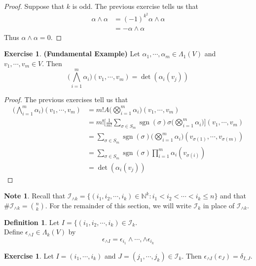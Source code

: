 \documentclass[12pt]{amsart}
\theoremstyle{definition}
\newtheorem{defn}[definition]{Definition}
\newtheorem{note}[definition]{Note}
\theoremstyle{definition}
\newtheorem{ex}[definition]{Exercise}
\newcommand{\al}{\alpha}
\newcommand{\del}{\delta}
\newcommand{\Lam}{\Lambda}
\newcommand{\ep}{\epsilon}
\newcommand{\sig}{\sigma}
\newcommand{\N}{\mathbb{N}}
\newcommand{\MI}{\mathcal{I}}
\DeclareMathOperator{\sgn}{sgn}
\begin{document}
	\begin{proof}
		Suppose that $k$ is odd. The previous exercise tells us that 
		\begin{align*}
			\al \wedge \al 
			&= (-1)^{k^2} \al \wedge \al \\
			&= -\al \wedge \al
		\end{align*}
		Thus $\al \wedge \al = 0$.
	\end{proof}
	
	\begin{ex}\textbf{(Fundamental Example)}
		Let $\al_1, \cdots, \al_m \in \Lam_1(V)$ and $v_1, \cdots, v_m \in V$. Then $$\bigg( \bigwedge_{i=1}^m \al_i \bigg)(v_1, \cdots, v_m) = \det (\al_i (v_j))$$
	\end{ex}

	\begin{proof}
		The previous exercises tell us that
		\begin{align*}
			\bigg( \bigwedge_{i=1}^m \al_i \bigg)(v_1, \cdots, v_m)
			&= m! A\bigg( \bigotimes_{i=1}^m \al_i \bigg) (v_1, \cdots, v_m) \\
			&= m! \bigg[ \frac{1}{m!} \sum_{\sig \in S_{m}} \sgn(\sig) \sig \bigg(\bigotimes_{i=1}^m \al_i \bigg) \bigg] (v_1, \cdots, v_m) \\
			&= \sum_{\sig \in S_{m}} \sgn(\sig)  \bigg(\bigotimes_{i=1}^m \al_i \bigg) (v_{\sig(1)}, \cdots, v_{\sig(m)}) \\
			&= \sum_{\sig \in S_{m}} \sgn(\sig)  \prod_{i=1}^m \al_i(v_{\sig(i)})   \\
			&= \det (\al_i (v_j))
		\end{align*}
	\end{proof}

	\begin{note}
		Recall that $\MI_{\wedge k} = \{(i_1, i_2, \cdots, i_k) \in \N^k: i_1 < i_2 < \cdots < i_k \leq n \}$ and that $\# \MI_{\wedge k} = {n \choose k}$. For the remainder of this section, we will write $\MI_k$ in place of $\MI_{\wedge k}$.
	\end{note}

	\begin{defn}
		Let $I = \{(i_1, i_2, \cdots, i_k) \in \MI_k$. \\ Define $\ep_{\wedge I} \in \Lam_k(V)$ by $$ \ep_{\wedge I} = \ep_{i_1} \wedge \cdots, \wedge \ep_{i_k} $$ 
	\end{defn}

	\begin{ex}
		Let $I = (i_1, \cdots, i_k)$ and $J = (j_1, \cdots, j_k) \in \MI_k$. Then $\ep_{\wedge I} (e_J) = \del_{I,J}$.
	\end{ex}
\end{document}
